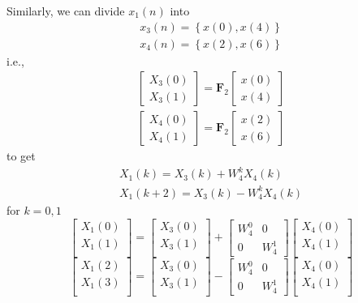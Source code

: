 \documentclass[journal,12pt,twocolumn]{IEEEtran}
\providecommand{\cbrak}[1]{\ensuremath{\left\{#1\right\}}}
\let\vec\mathbf
\numberwithin{equation}{section}
\renewcommand\thesection{\arabic{section}}
\newcommand{\mymat}[1]{\ensuremath{\begin{bmatrix}#1\end{bmatrix}}}
\renewcommand\thesection{\arabic{section}}
\begin{document}
\begin{enumerate}[label=\arabic*.,ref=\thesection.\theenumi]
	Similarly, we can divide $x_1(n)$ into 
	\begin{align}
		x_3(n) = \cbrak{x(0), x(4)} \\
		x_4(n) = \cbrak{x(2), x(6)}
	\end{align}
	i.e.,
	\begin{align}
		\mymat{X_3(0) \\ X_3(1)} = \vec{F}_2 \mymat{x(0) \\ x(4)} \\
		\mymat{X_4(0) \\ X_4(1)} = \vec{F}_2 \mymat{x(2) \\ x(6)}
	\end{align}
	to get
	\begin{align}
		X_1(k) = X_3(k) + W_4^k X_4(k) \\
		X_1(k + 2) = X_3(k) - W_4^k X_4(k) 
	\end{align}
	for $k = 0, 1$
	\begin{equation}
\begin{bmatrix}
X_{1}(0) \\ 
X_{1}(1)\\ 
\end{bmatrix}
=
\begin{bmatrix}
X_{3}(0) \\ 
X_{3}(1)\\ 
\end{bmatrix}
+
\begin{bmatrix}
W^{0}_{4} & 0\\
0 & W^{1}_{4}
\end{bmatrix}
\begin{bmatrix}
X_{4}(0) \\ 
X_{4}(1) \\ 
\end{bmatrix}
\end{equation}
\begin{equation}
\begin{bmatrix}
X_{1}(2) \\ 
X_{1}(3)\\ 
\end{bmatrix}
=
\begin{bmatrix}
X_{3}(0) \\ 
X_{3}(1)\\ 
\end{bmatrix}
-
\begin{bmatrix}
W^{0}_{4} & 0\\
0 & W^{1}_{4}
\end{bmatrix}
\begin{bmatrix}
X_{4}(0) \\ 
X_{4}(1) \\ 
\end{bmatrix}
\end{equation}


\end{enumerate}
\end{document}

